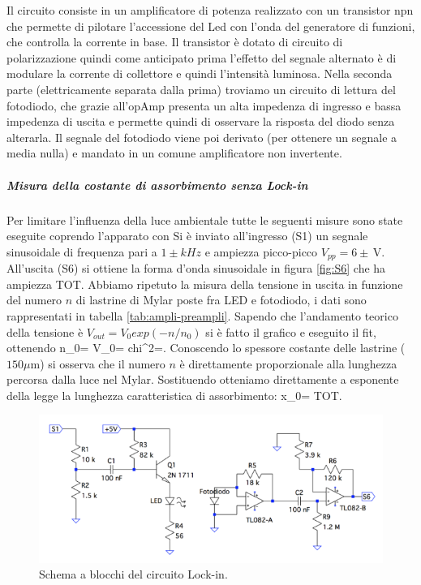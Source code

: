 \documentclass[10pt,a4paper]{article}
\begin{document}
Il circuito consiste in un amplificatore di potenza realizzato con un transistor npn che permette di pilotare l'accessione del Led con l'onda del generatore di funzioni, che controlla la corrente in base.
Il transistor è dotato di circuito di polarizzazione quindi come anticipato prima l'effetto del segnale alternato è di modulare la corrente di collettore e quindi l'intensità luminosa.
Nella seconda parte (elettricamente separata dalla prima) troviamo un  circuito di lettura del fotodiodo, che grazie all'opAmp presenta un alta impedenza di ingresso e bassa impedenza di uscita e permette quindi di osservare la risposta del diodo senza alterarla.
Il segnale del fotodiodo viene poi derivato (per ottenere un segnale a media nulla) e mandato in un comune amplificatore non invertente.\\

\subparagraph{Misura della costante di assorbimento senza Lock-in}
Per limitare l'influenza della luce ambientale tutte le seguenti misure sono state eseguite coprendo l'apparato con %
Si è inviato all'ingresso (S1) un segnale sinusoidale di frequenza pari a $1\pm  kHz$ e ampiezza picco-picco $V_{pp}= 6 \pm \,\mbox{V}$. All'uscita (S6) si ottiene la forma d'onda sinusoidale in figura \ref{fig:S6} che ha ampiezza TOT. Abbiamo ripetuto la misura della tensione in uscita in funzione del numero $n$ di lastrine di Mylar poste fra LED e fotodiodo, i dati sono rappresentati in tabella \ref{tab:ampli-preampli}. Sapendo che l'andamento teorico della tensione è $V_{out}=V_0exp(-n/n_0)$ si è fatto il grafico e eseguito il fit, ottenendo n_0= V_0= chi^2=. Conoscendo lo spessore costante delle lastrine ($150\mu \mbox{m}$) si osserva che il numero $n$ è direttamente proporzionale alla lunghezza percorsa dalla luce nel Mylar. Sostituendo otteniamo direttamente a esponente della legge la lunghezza caratteristica di assorbimento: x_0= TOT.

\begin{figure}[!htb]
  \centering
  \includegraphics[scale=0.75]{ampli-preampli.png}
\caption{Schema a blocchi del circuito Lock-in.\label{fig:ampli-preampli}}
\end{figure}
\end{document}
